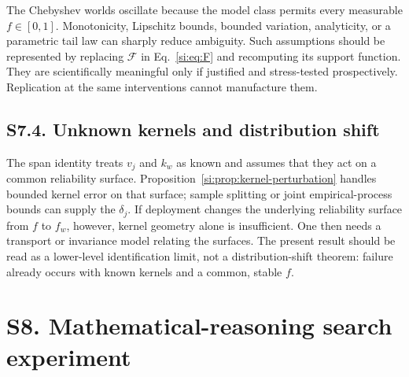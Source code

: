 \documentclass[10pt,twocolumn]{article}
\newcommand{\cF}{\mathcal F}
\begin{document}
The Chebyshev worlds oscillate because the model class permits every measurable $f\in[0,1]$. Monotonicity, Lipschitz bounds, bounded variation, analyticity, or a parametric tail law can sharply reduce ambiguity. Such assumptions should be represented by replacing $\cF$ in Eq.~\ref{si:eq:F} and recomputing its support function. They are scientifically meaningful only if justified and stress-tested prospectively. Replication at the same interventions cannot manufacture them.

\subsection*{S7.4. Unknown kernels and distribution shift}

The span identity treats $v_j$ and $k_w$ as known and assumes that they act on a common reliability surface. Proposition~\ref{si:prop:kernel-perturbation} handles bounded kernel error on that surface; sample splitting or joint empirical-process bounds can supply the $\delta_j$. If deployment changes the underlying reliability surface from $f$ to $f_w$, however, kernel geometry alone is insufficient. One then needs a transport or invariance model relating the surfaces. The present result should be read as a lower-level identification limit, not a distribution-shift theorem: failure already occurs with known kernels and a common, stable $f$.

\section*{S8. Mathematical-reasoning search experiment}
\end{document}
